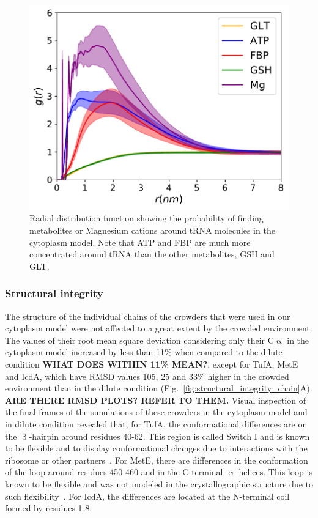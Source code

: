 \documentclass[journal=jcisd8,manuscript=article]{achemso}
\begin{document}
\begin{figure}[H]
\includegraphics[scale=0.5]{rdf_RNA_metabolites.pdf}
\caption{Radial distribution function showing the probability of
  finding metabolites or Magnesium cations around tRNA molecules in
  the cytoplasm model. Note that ATP and FBP are much more
  concentrated around tRNA than the other metabolites, GSH and GLT.}
\label{fig:tRNA_aggregation}
\end{figure}


\subsubsection{Structural integrity}
The structure of the individual chains of the crowders that were used
in our cytoplasm model were not affected to a great extent by the
crowded environment. The values of their root mean square deviation considering only
their C$\upalpha$ in the cytoplasm model {\color{blue} increased by less than 11\% when compared to the dilute condition} {\bf WHAT DOES WITHIN 11\% MEAN?}, except for
TufA, MetE and IcdA, which have RMSD values 105, 25 and 33\% higher in
the crowded environment than in the dilute condition {\color{blue}(Fig.~\ref{fig:structural_integrity_chain}A)}. {\bf ARE THERE
  RMSD PLOTS? REFER TO THEM.} {\color{blue} Visual inspection of the final frames of the simulations of these crowders in the cytoplasm model and in dilute condition revealed that, for TufA, the conformational differences are on the $\upbeta$-hairpin around residues 40-62. This region is called Switch I and is known to be flexible and to display conformational changes due to interactions with the ribosome or other partners~\cite{Abel1996}. For MetE, there are differences in the conformation of the loop around residues 450-460 and in the C-terminal $\upalpha$-helices. This loop is known to be flexible and was not modeled in the crystallographic structure due to such flexibility~\cite{Ferrer2004}. For IcdA, the differences are located at the N-terminal coil formed by residues 1-8.} 
\end{document}
